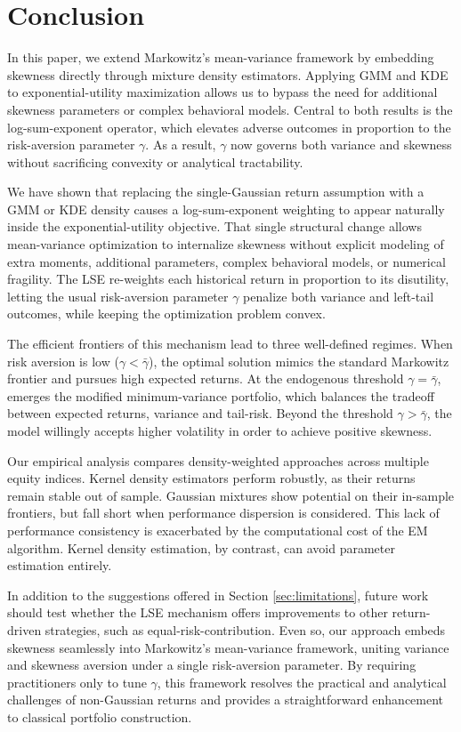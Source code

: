 \chapter{Conclusion}
\label{chap:conclusion}
\vspace*{-1\baselineskip}

In this paper, we extend Markowitz's mean-variance framework by embedding skewness directly through mixture density estimators. Applying GMM and KDE to exponential-utility maximization allows us to bypass the need for additional skewness parameters or complex behavioral models. Central to both results is the log-sum-exponent operator, which elevates adverse outcomes in proportion to the risk-aversion parameter $\gamma$. As a result, $\gamma$ now governs both variance and skewness without sacrificing convexity or analytical tractability.

We have shown that replacing the single-Gaussian return assumption with a GMM or KDE density causes a log-sum-exponent weighting to appear naturally inside the exponential-utility objective. That single structural change allows mean-variance optimization to internalize skewness without explicit modeling of extra moments, additional parameters, complex behavioral models, or numerical fragility. The LSE re-weights each historical return in proportion to its disutility, letting the usual risk-aversion parameter $\gamma$ penalize both variance and left-tail outcomes, while keeping the optimization problem convex.

The efficient frontiers of this mechanism lead to three well-defined regimes. When risk aversion is low ($\gamma<\bar{\gamma}$), the optimal solution mimics the standard Markowitz frontier and pursues high expected returns. At the endogenous threshold $\gamma=\bar{\gamma}$, emerges the modified minimum-variance portfolio, which balances the tradeoff between expected returns, variance and tail-risk. Beyond the threshold $\gamma>\bar{\gamma}$, the model willingly accepts higher volatility in order to achieve positive skewness.

Our empirical analysis compares density-weighted approaches across multiple equity indices. Kernel density estimators perform robustly, as their returns remain stable out of sample. Gaussian mixtures show potential on their in-sample frontiers, but fall short when performance dispersion is considered. This lack of performance consistency is exacerbated by the computational cost of the EM algorithm. Kernel density estimation, by contrast, can avoid parameter estimation entirely.

In addition to the suggestions offered in Section \ref{sec:limitations}, future work should test whether the LSE mechanism offers improvements to other return-driven strategies, such as equal-risk-contribution. Even so, our approach embeds skewness seamlessly into Markowitz's mean-variance framework, uniting variance and skewness aversion under a single risk-aversion parameter. By requiring practitioners only to tune $\gamma$, this framework resolves the practical and analytical challenges of non-Gaussian returns and provides a straightforward enhancement to classical portfolio construction.